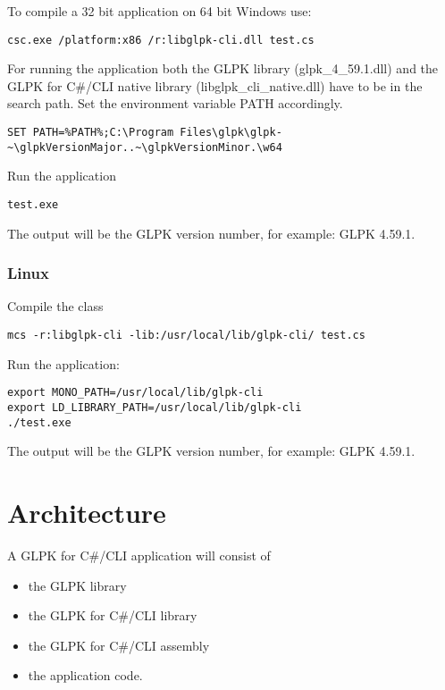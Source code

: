 \documentclass[a4paper,11pt]{report}
\newcommand{\glpkVersionMajor}{4}
\newcommand{\glpkVersionMinor}{59.1}
\begin{document}
To compile a 32 bit application on 64 bit Windows use:

\begin{lstlisting}
csc.exe /platform:x86 /r:libglpk-cli.dll test.cs
\end{lstlisting}

For running the application both the GLPK library
(glpk\_\glpkVersionMajor\_\glpkVersionMinor.dll) and the GLPK for C\#/CLI
native library (libglpk\_cli\_native.dll) have to be in the search path.
Set the environment variable PATH accordingly.

\begin{lstlisting}
SET PATH=%PATH%;C:\Program Files\glpk\glpk-~\glpkVersionMajor..~\glpkVersionMinor.\w64
\end{lstlisting}

Run the application

\begin{lstlisting}
test.exe
\end{lstlisting}

The output will be the GLPK version number, for example:
GLPK \glpkVersionMajor.\glpkVersionMinor.

\subsection{Linux}
Compile the class

\begin{lstlisting}
mcs -r:libglpk-cli -lib:/usr/local/lib/glpk-cli/ test.cs
\end{lstlisting}

Run the application:

\begin{lstlisting}
export MONO_PATH=/usr/local/lib/glpk-cli
export LD_LIBRARY_PATH=/usr/local/lib/glpk-cli
./test.exe
\end{lstlisting}

The output will be the GLPK version number, for example:
GLPK \glpkVersionMajor.\glpkVersionMinor.

\chapter{Architecture}
A GLPK for C\#/CLI application will consist of
\begin{itemize}
\item the GLPK library
\item the GLPK for C\#/CLI library
\item the GLPK for C\#/CLI assembly
\item the application code.
\end{itemize}
\end{document}
